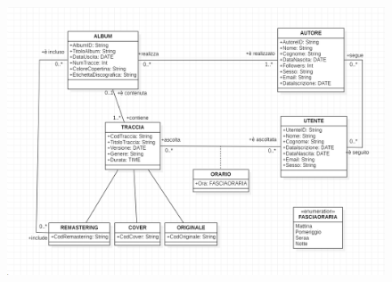 \documentclass[11pt]{article}
\begin{document}
	\begin{figure}
		\centering
		\includegraphics[width=1\linewidth]{SpotifyPezzotto.png}
		\caption{}
		\label{spotifypezzotto}
	\end{figure}
	
	\clearpage
\end{document}
